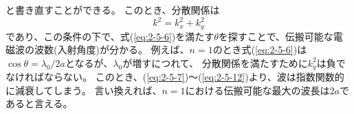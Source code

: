 \documentclass[a4paper,11pt,titlepage]{jsarticle}
\begin{document}
  と書き直すことができる。
  このとき、分散関係は
  \begin{equation}
    \label{eq:2-5-19}
    k^2 = k_x^2 + k_y^2
  \end{equation}
  であり、この条件の下で、式(\ref{eq:2-5-6})を満たす$\theta$を探すことで、伝搬可能な電磁波の波数(入射角度)が分かる。
  例えば、$n=1$のとき式(\ref{eq:2-5-6})は$\cos \theta = \lambda_0 / 2 a $となるが、$\lambda_0$が増すにつれて、
  分散関係を満たすために$k_y^2$は負でなければならない。
  このとき、(\ref{eq:2-5-7})～(\ref{eq:2-5-12})より、波は指数関数的に減衰してしまう。
  言い換えれば、$n = 1$における伝搬可能な最大の波長は$2a$であると言える。
  \newpage 
\end{document}
